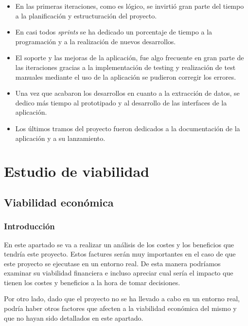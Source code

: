 \begin{itemize}
\item En las primeras iteraciones, como es lógico, se invirtió gran parte del tiempo a la planificación y estructuración del proyecto.

\item En casi todos \textit{sprints} se ha dedicado un porcentaje de tiempo a la programación y a la realización de nuevos desarrollos.

\item El soporte y las mejoras de la aplicación, fue algo frecuente en gran parte de las iteraciones gracias a la implementación de testing y realización de test manuales mediante el uso de la aplicación se pudieron corregir los errores.

\item Una vez que acabaron los desarrollos en cuanto a la extracción de datos, se dedico más tiempo al prototipado y al desarrollo de las interfaces de la aplicación.

\item Los últimos tramos del proyecto fueron dedicados a la documentación de la aplicación y a su lanzamiento.

\end{itemize}

\section{Estudio de viabilidad}

\subsection{Viabilidad económica}

\subsubsection{Introducción}
En este apartado se va a realizar un análisis de los costes y los beneficios que tendría este proyecto. Estos factures serán muy importantes en el caso de que este proyecto se ejecutase en un entorno real. De esta manera podríamos examinar su viabilidad financiera e incluso apreciar cual sería el impacto que tienen los costes y beneficios a la hora de tomar decisiones.

Por otro lado, dado que el proyecto no se ha llevado a cabo  en un entorno real, podría haber otros factores que afecten a la viabilidad económica del mismo y que no hayan sido detallados en este apartado.

